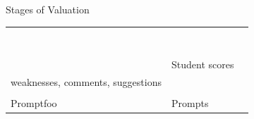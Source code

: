 \begin{simpleCenteringTempChapterTable}{Stages of Valuation}
	\def\cellTenA{\makecell[l]{Feedback Generator }}
	\def\cellTenB{Student scores}
	\def\cellTenC{\makecell[l]{feedback including strengths \\  weaknesses, comments, suggestions }}
	
	\def\cellElevenA{\makecell[l]{Prompt testing\\ Promptfoo }}
	\def\cellElevenB{Prompts}
	\def\cellElevenC{\makecell[l]{proper response }}
	 

	\begin{tabular}{|l|l|l|} \hline
		\cellLayer 		& \cellPy 			& \cellJs 			\\ \hline
		\cellTwoA 		& \cellTwoB 		& \cellTwoC 		\\ \hline
		\cellThreeA 	& \cellThreeB 		& \cellThreeC 		\\ \hline
		\cellFourA 		& \cellFourB 		& \cellFourC 		\\ \hline
		\cellFiveA 		& \cellFiveB 		& \cellFiveC 		\\ \hline
		\cellSixA 		& \cellSixB 		& \cellSixC 		\\ \hline
		\cellSevenA 	& \cellSevenB 		& \cellSevenC 		\\ \hline
		\cellEightA 	& \cellEightB 		& \cellEightC 		\\ \hline
		\cellNineA 		& \cellNineB 		& \cellNineC 		\\ \hline
		\cellTenA 		& \cellTenB 		& \cellTenC 		\\ \hline
		\cellElevenA 	& \cellElevenB 		& \cellElevenC 		\\ \hline
	\end{tabular}
\end{simpleCenteringTempChapterTable}